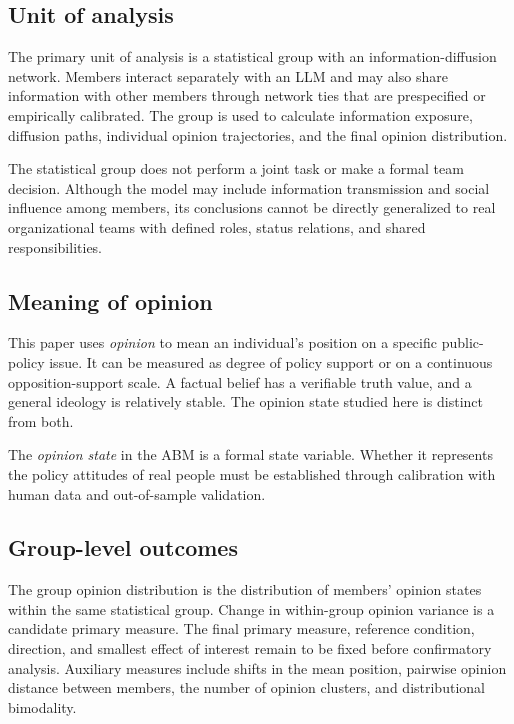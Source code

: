 \documentclass[11pt,a4paper]{article}
\newcommand{\term}[1]{\textit{#1}}
\begin{document}
\subsection{Unit of analysis}

The primary unit of analysis is a statistical group with an information-diffusion network. Members interact separately with an LLM and may also share information with other members through network ties that are prespecified or empirically calibrated. The group is used to calculate information exposure, diffusion paths, individual opinion trajectories, and the final opinion distribution.

The statistical group does not perform a joint task or make a formal team decision. Although the model may include information transmission and social influence among members, its conclusions cannot be directly generalized to real organizational teams with defined roles, status relations, and shared responsibilities.

\subsection{Meaning of opinion}

This paper uses \term{opinion} to mean an individual's position on a specific public-policy issue. It can be measured as degree of policy support or on a continuous opposition-support scale. A factual belief has a verifiable truth value, and a general ideology is relatively stable. The opinion state studied here is distinct from both.

The \term{opinion state} in the ABM is a formal state variable. Whether it represents the policy attitudes of real people must be established through calibration with human data and out-of-sample validation.

\subsection{Group-level outcomes}

The group opinion distribution is the distribution of members' opinion states within the same statistical group. Change in within-group opinion variance is a candidate primary measure. The final primary measure, reference condition, direction, and smallest effect of interest remain to be fixed before confirmatory analysis. Auxiliary measures include shifts in the mean position, pairwise opinion distance between members, the number of opinion clusters, and distributional bimodality.
\end{document}
